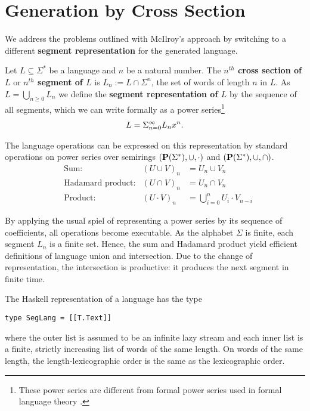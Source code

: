 \section{Generation by Cross Section}
\label{sec:gener-cross-sect}

We address the problems outlined with McIlroy's approach by switching to a
different \textbf{segment representation} for the generated language.

Let $L\subseteq\Sigma^*$ be a language and $n$ be a natural
number. The \textbf{$n^{th}$ cross section of $L$} or
\textbf{$n^{th}$ segment of $L$} is $L_n := L \cap \Sigma^n$, the set of
words of length $n$ in $L$. As $L = \bigcup_{n\ge0} L_n$ we
define the \textbf{segment representation of $L$} by the
sequence of all segments, which we can write formally as a
power series\footnote{These power series are different
  from formal power series used in formal language theory
  \cite{DBLP:books/daglib/0067812,DBLP:books/sp/KuichS86}.}
\begin{gather*}
  L = \Sigma_{n=0}^\infty L_nx^n\text.
\end{gather*}

The language operations can be expressed on this representation by
standard operations on power series over semirings
$(\mathbf{P}(\Sigma^*),\cup,\cdot)$ and $(\mathbf{P}(\Sigma^*), \cup, \cap)$.
\begin{align}
  \label{eq:3}
  &\text{Sum:}
  & (U \cup V)_n &= U_n \cup V_n \\
  \label{eq:4}
  &\text{Hadamard product:}
  & (U \cap V)_n &= U_n \cap V_n \\
  \label{eq:1}
  &\text{Product:}
  & (U \cdot V)_n &= \bigcup_{i=0}^n U_i\cdot V_{n-i}
\end{align}

By applying
the usual spiel of representing a power series by its sequence of
coefficients, all operations become executable.
%
As the alphabet $\Sigma$ is finite, each segment $L_n$ is a finite set. Hence, the sum and
Hadamard product yield efficient definitions of language union and intersection. Due to
the change of representation, the intersection is productive: it produces the next segment
in finite time.

The Haskell representation of a language has the type
\begin{lstlisting}[numbers=none]
type SegLang = [[T.Text]]
\end{lstlisting}
where the outer list is assumed to be an infinite lazy stream and each inner list is
a finite, strictly increasing list of words of the same length. On
words of the same length, the length-lexicographic order is the same
as the lexicographic order.

